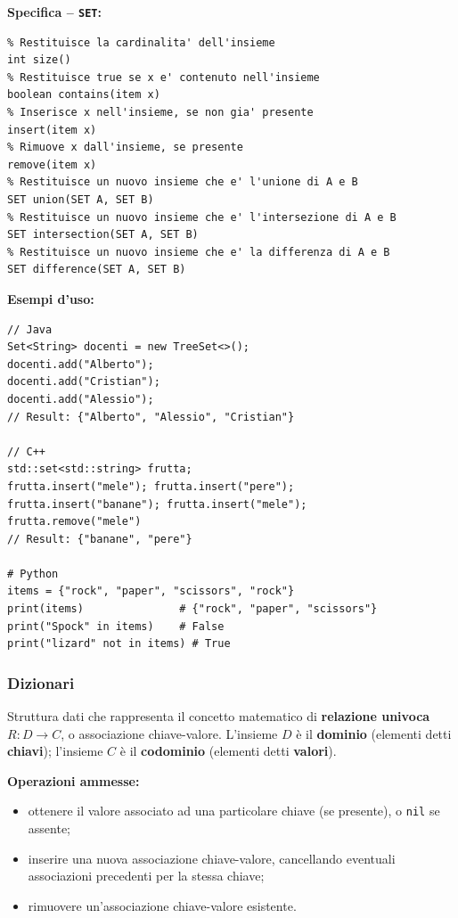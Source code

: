 \documentclass[12pt, a4paper]{article}
\begin{document}
\textbf{Specifica -- \texttt{SET}:}
\begin{verbatim}
% Restituisce la cardinalita' dell'insieme
int size()
% Restituisce true se x e' contenuto nell'insieme
boolean contains(item x)
% Inserisce x nell'insieme, se non gia' presente
insert(item x)
% Rimuove x dall'insieme, se presente
remove(item x)
% Restituisce un nuovo insieme che e' l'unione di A e B
SET union(SET A, SET B)
% Restituisce un nuovo insieme che e' l'intersezione di A e B
SET intersection(SET A, SET B)
% Restituisce un nuovo insieme che e' la differenza di A e B
SET difference(SET A, SET B)
\end{verbatim}

\textbf{Esempi d'uso:}
\begin{verbatim}
// Java
Set<String> docenti = new TreeSet<>();
docenti.add("Alberto");
docenti.add("Cristian");
docenti.add("Alessio");
// Result: {"Alberto", "Alessio", "Cristian"}

// C++
std::set<std::string> frutta;
frutta.insert("mele"); frutta.insert("pere");
frutta.insert("banane"); frutta.insert("mele");
frutta.remove("mele")
// Result: {"banane", "pere"}

# Python
items = {"rock", "paper", "scissors", "rock"}
print(items)               # {"rock", "paper", "scissors"}
print("Spock" in items)    # False
print("lizard" not in items) # True
\end{verbatim}

\subsubsection{Dizionari}

\begin{tcolorbox}[colback=lightergray!10, colframe=tocsec, title=\textbf{Definizione: Dizionario}]
\label{def:dizionario}
Struttura dati che rappresenta il concetto matematico di \textbf{relazione univoca} $R:D\to C$, o associazione chiave-valore. L'insieme $D$ è il \textbf{dominio} (elementi detti \textbf{chiavi}); l'insieme $C$ è il \textbf{codominio} (elementi detti \textbf{valori}).
\end{tcolorbox}

\textbf{Operazioni ammesse:}
\begin{itemize}
    \item ottenere il valore associato ad una particolare chiave (se presente), o \texttt{nil} se assente;
    \item inserire una nuova associazione chiave-valore, cancellando eventuali associazioni precedenti per la stessa chiave;
    \item rimuovere un'associazione chiave-valore esistente.
\end{itemize}
\end{document}
